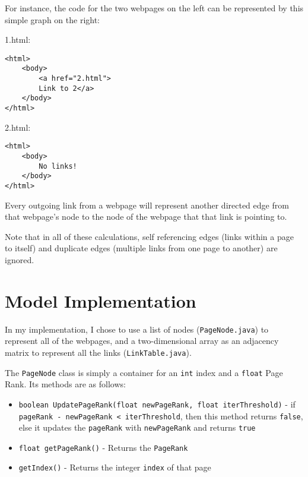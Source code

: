 \documentclass[11pt]{article}
\begin{document}
For instance, the code for the two webpages on the left can be represented by this simple graph on the right:
\begin{multicols}{2}
1.html:
\begin{verbatim}
<html>
    <body>
        <a href="2.html">
        Link to 2</a>
    </body>
</html>

\end{verbatim}


2.html:
\begin{verbatim}
<html>
    <body>
        No links!
    </body>
</html>
\end{verbatim}
\columnbreak
\begin{center}
\label{fig:webgraph}
\end{center}
\end{multicols}

Every outgoing link from a webpage will represent another directed edge from that webpage's node to the node of the webpage that that link is pointing to.
\newline

Note that in all of these calculations, self referencing edges (links within a page to itself) and duplicate edges (multiple links from one page to another) are ignored.

\section*{Model Implementation}
In my implementation, I chose to use a list of nodes (\verb!PageNode.java!) to represent all of the webpages, and a two-dimensional array as an adjacency matrix to represent all the links (\verb!LinkTable.java!).
\newline

The \verb!PageNode! class is simply a container for an \verb!int! index and a \verb!float! Page Rank. Its methods are as follows:
\begin{itemize}
\item \verb!boolean UpdatePageRank(float newPageRank, float iterThreshold)! - if \verb!pageRank - newPageRank < iterThreshold!, then this method returns \verb!false!, else it updates the \verb!pageRank! with \verb!newPageRank! and returns \verb!true!
\item \verb!float getPageRank()! - Returns the \verb!PageRank!
\item \verb!getIndex()! - Returns the integer \verb!index! of that page
\end{itemize}
\end{document}
